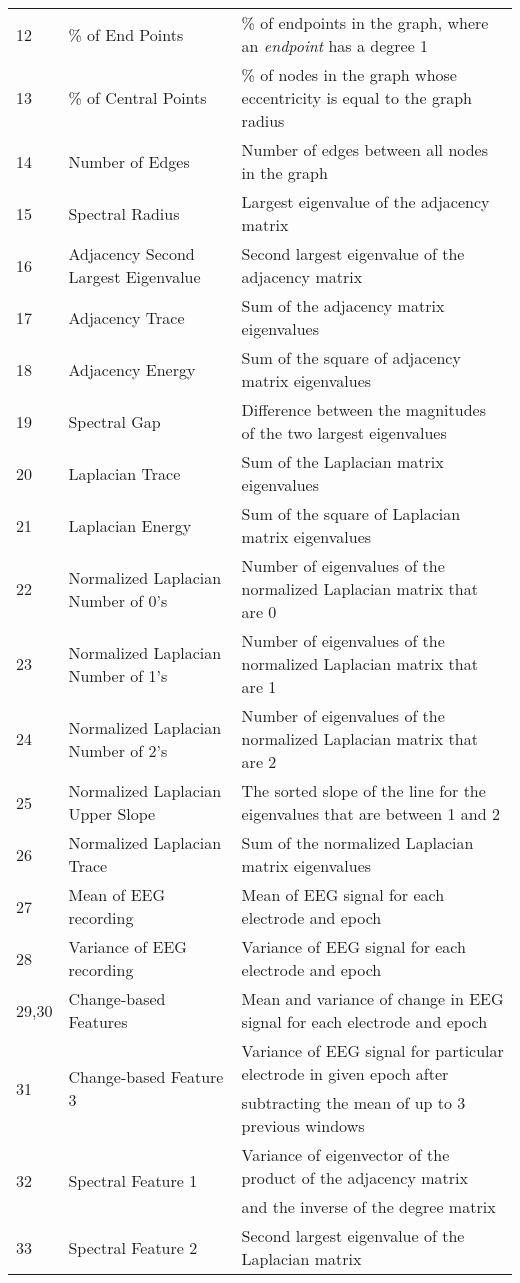 \documentclass{article} %
\theoremstyle{definition}
\theoremstyle{remark}
\begin{document}
\begin{table}[htb]
\begin{tabular}{lll}
12&\% of End Points&\% of endpoints in the graph, where an {\em endpoint} has a degree 1\\
13&\% of Central Points&\% of nodes in the graph whose eccentricity is equal to the graph radius\\
14&Number of Edges&Number of edges between all nodes in the graph\\
15&Spectral Radius & Largest eigenvalue of the adjacency matrix\\
16&Adjacency Second Largest Eigenvalue&Second largest eigenvalue of the adjacency matrix\\
17&Adjacency Trace & Sum of the adjacency matrix eigenvalues\\
18&Adjacency Energy & Sum of the square of adjacency matrix eigenvalues\\
19&Spectral Gap &  Difference between the magnitudes of the two largest eigenvalues\\
20 &Laplacian Trace & Sum of the Laplacian matrix eigenvalues\\
21&Laplacian Energy &  Sum of the square of Laplacian matrix eigenvalues\\
22&Normalized Laplacian Number of 0's & Number of eigenvalues of the normalized Laplacian matrix that are 0\\
23&Normalized Laplacian Number of 1's&  Number of eigenvalues of the normalized Laplacian matrix that are 1\\
24&Normalized Laplacian Number of 2's& Number of eigenvalues of the normalized Laplacian matrix that are 2\\ 
25&Normalized Laplacian Upper Slope& The sorted slope of the line for the eigenvalues that are between 1 and 2\\
26&Normalized Laplacian Trace& Sum of the normalized Laplacian matrix eigenvalues\\
27&Mean of EEG recording&Mean of EEG signal for each electrode and epoch\\
28&Variance of EEG recording&Variance of EEG signal for each electrode and epoch\\
29,30&Change-based Features&Mean and variance of change in EEG signal for each electrode and epoch\\
\multirow{2}{*}{31}&\multirow{2}{*}{Change-based Feature 3}&Variance of EEG signal for particular electrode in given epoch after\\
&&subtracting the mean of up to 3 previous windows \\
\multirow{2}{*}{32}&\multirow{2}{*}{Spectral Feature 1}&Variance of eigenvector of the product of the adjacency matrix
\\&& and the inverse of the degree matrix\\
33&Spectral Feature 2&Second largest eigenvalue of the Laplacian matrix\\
\hline
\end{tabular}
\end{table}
\end{document}
